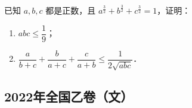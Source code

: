 \begin{description}
\begin{enumerate}[leftmargin=5pt]
        已知 $a,b,c$ 都是正数，且 $a^{\frac{3}{2}}+b^{\frac{3}{2}}+c^{\frac{3}{2}}=1$，证明：

        \begin{enumerate}[label=(\arabic*)]
            \item $abc\leqslant\dfrac{1}{9}$；
            \item $\dfrac{a}{b+c}+\dfrac{b}{a+c}+\dfrac{c}{a+b}\leqslant\dfrac{1}{2\sqrt{abc}}$．
        \end{enumerate}
    \end{enumerate}
\end{description}
\clearpage


\subsection{2022年全国乙卷（文）}\label{gk:2022年全国乙卷（文）}

